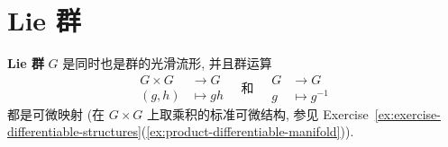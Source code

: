 \section{Lie 群}\label{sec:lie-groups}

\textbf{Lie 群} $G$ 是同时也是群的光滑流形, 并且群运算
\[
  \begin{aligned}
    G\times G&\to G\\
    (g,h)&\mapsto gh
  \end{aligned}
  \quad\text{和}\quad
  \begin{aligned}
    G&\to G\\
    g&\mapsto g^{-1}
  \end{aligned}
\]
都是可微映射 (在 $G\times G$ 上取乘积的标准可微结构, 参见 Exercise~\ref{ex:exercise-differentiable-structures}(\ref{ex:product-differentiable-manifold})).

